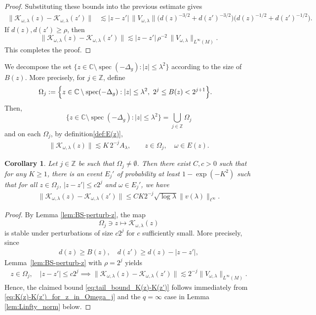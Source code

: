\documentclass[12pt,reqno]{amsart}
\newtheorem{corollary}[theorem]{Corollary}
\theoremstyle{definition}
\theoremstyle{remark}
\numberwithin{equation}{section}
\newcommand{\1}{\mathbbm{1}}
\newcommand{\C}{\mathbb{C}}
\newcommand{\Z}{\mathbb{Z}}
\DeclareMathOperator{\spec}{spec}
\begin{document}
\begin{proof}
Substituting these bounds into the previous estimate gives
\begin{align*}
\|\mathcal{K}_{\omega,\lambda}(z)-\mathcal{K}_{\omega,\lambda}(z')\|
&\lesssim
|z-z'|\,\|V_{\omega,\lambda}\|
\bigl(d(z)^{-3/2}+d(z')^{-3/2}\bigr)
\bigl(d(z)^{-1/2}+d(z')^{-1/2}\bigr).
\end{align*}
If \(d(z),d(z')\geq \rho\), then
\[
\|\mathcal{K}_{\omega,\lambda}(z)-\mathcal{K}_{\omega,\lambda}(z')\|
\lesssim
|z-z'|\,\rho^{-2}\,\|V_{\omega,\lambda}\|_{L^{\infty}(M)}.
\]
This completes the proof.
\end{proof}


We decompose the set \(\{z\in \C\setminus \spec(-\Delta_g):|z|\leq \lambda^2\}\)
according to the size of \(B(z)\). More precisely, for $j\in\Z$, define
\begin{align*}
\Omega_j&:=\Bigl\{z\in \C\setminus\spec(-\Delta_g): |z|\leq \lambda^2,\ 
2^{j}\leq B(z)<2^{j+1}\Bigr\}.
\end{align*}
Then,
$$
\{z\in \C\setminus \spec(-\Delta_g):|z|\leq \lambda^2\} = \bigcup_{j\in\Z}\Omega_j
$$
and on each \(\Omega_j\), by definition\eqref{def:E(z)},
\begin{align}\label{eq:EnormBS_j}
    \|\mathcal{K}_{\omega,\lambda}(z)\|
\lesssim
K\,2^{-j}A_\lambda,
\qquad z\in \Omega_j,\quad \omega\in E(z).
\end{align}


\begin{corollary}\label{cor:tail_bound_K(z)-K(z')}
Let \(j\in \mathbb Z\) be such that \(\Omega_j\neq \emptyset\). Then there exist $C,c>0$ such that for any $K\geq 1$, there is an event $E_j'$ of probability at least $1-\exp(-K^2)$ such that for all $z\in\Omega_j$, $|z-z'|\leq c2^{j}$ and $\omega\in E_j'$, we have
  \begin{align}\label{eq:tail_bound_K(z)-K(z')}
    \|\mathcal{K}_{\omega,\lambda}(z)-\mathcal{K}_{\omega,\lambda}(z')\|\leq CK2^{-j}\sqrt{\log\lambda} \|v(\lambda)\|_{\ell^{\infty}}.
  \end{align}
\end{corollary}

\begin{proof}
By Lemma \ref{lem:BS-perturb-z}, the map
\[
\Omega_j\ni z\mapsto \mathcal{K}_{\omega,\lambda}(z)
\]
is stable under perturbations of size \(c2^{j}\) for $c$ sufficiently small. 
More precisely, since 
\begin{align*}
d(z)\geq  B(z),\quad
d(z')\geq d(z)-|z-z'|,
\end{align*}
Lemma~\ref{lem:BS-perturb-z} with $\rho=2^j$ yields
\begin{align}\label{eq:K(z)-K(z')_for_z_in_Omega_j}
   z\in\Omega_j,\quad |z-z'|\leq c2^{j}\implies \|\mathcal{K}_{\omega,\lambda}(z)-\mathcal{K}_{\omega,\lambda}(z')\|\lesssim 2^{-j}\|V_{\omega,\lambda}\|_{L^{\infty}(M)}.
\end{align}
Hence, the claimed bound \eqref{eq:tail_bound_K(z)-K(z')} follows immediately from
\eqref{eq:K(z)-K(z')_for_z_in_Omega_j} and the $q=\infty$ case in Lemma \ref{lem:Linfty_norm} below. 
\end{proof}
\end{document}
